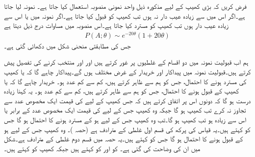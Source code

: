 \quad
فرض کریں کہ بڑی کھیپ کے لیے مذکورہ ذیل واحد نمونی منصوبہ استعمال کیا جاتا ہے۔ نمونہ لیا جاتا ہے۔اگر اس میں  سے زیادہ عیب دار نہ ہوں تب کھیپ کو قبول کیا جاتا ہے۔اگر نمونہ میں  یا اس سے زیادہ عیب دار ہوں تب کھیپ کو مسترد کیا جاتا ہے۔اس منصوبہ میں مساوات  درج ذیل دیتا ہے
\begin{align*}
P(A;\theta)\sim e^{-20\theta} (1+20\theta)
\end{align*}
جس کی مطابقتی منحنی شکل  میں دکھائی گئی ہے۔

ہم اب قبولیت نمونہ میں دو اقسام کے غلطیوں پر غور کرتے ہیں اور  اور  منتخب کرنے کی تفصیل پیش کرتے ہیں۔قبولیت نمونہ میں پیداکار اور خریدار کے غرض مختلف ہوں گے۔پیداکار چاہے گا کہ  یا  کھیپ کی مسترد ہونے کا احتمال، جس کو ہم  سے ظاہر کرتے ہیں، کم سے کم  عدد  ہو۔ خریدار چاہے گا کہ  یا  کھیپ کے قبول ہونے کا احتمال، جس کو ہم  سے ظاہر کرتے ہیں، کم سے کم عدد ہو۔ یہ کہنا زیادہ درست ہو گا کہ دونوں اس پر اتفاق کرتے ہیں کہ جس کھیپ کے لیے  کی قیمت ایک مخصوص عدد  سے تجاوز نہ کرے تب کھیپ   ہو  گا جبکہ وہ کھیپ جس کے لیے   کی قیمت ایک مخصوص عدد   کے برابر یا اس  سے زیادہ ہو تب کھیپ  ہو گا۔تب وہ کھیپ جس کے لیے  ہو کے مسترد ہونے  کا احتمال  ہو گا جس کو  کہتے ہیں۔یہ قیاس کی پرکھ کی قسم اول غلطی  کے مترادف ہے (حصہ )۔  وہ کھیپ جس کے لیے  ہو کے قبول ہونے  کا احتمال  ہو گا جس کو  کہتے ہیں۔یہ حصہ  میں قسم دوم  غلطی  کے مترادف ہے۔شکل  میں ان کی وضاحت کی گئی ہے۔  کو  اور  کو  کہتے ہیں جبکہ کھیپ  کو  کہتے ہیں۔

